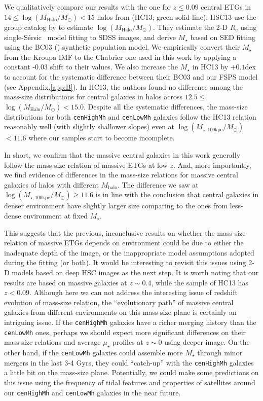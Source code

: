 \documentclass{emulateapj}
\def\ser{{S\'{e}rsic\ }}
\def\rbcg{\texttt{cenHighMh}}
\def\nbcg{\texttt{cenLowMh}}
\def\mstar{{$M_{\star}$}}
\def\mhalo{{$M_{\mathrm{halo}}$}}
\def\logmh{{$\log (M_{\mathrm{Halo}}/M_{\odot})$}}
\def\logmtot{{$\log (M_{\star,100\mathrm{kpc}}/M_{\odot})$}}
\def\mden{{$\mu_{\star}$}}
\begin{document}
\begin{CJK*}{UTF8}{gbsn}
    We qualitatively compare our results with the one for $z\leq 0.09$ central ETGs in  
    $14\le$\logmh{}$<15$ halos from \citealt{HCompany13} (HC13; green solid line).
    HSC13 use the group catalog by \citet{Yang2007} to estimate \logmh{}. 
    They estimate the 2-D $R_{\mathrm{e}}$ using single-\ser{} model fitting to SDSS images,
    and derive \mstar{} based on SED fitting using the BC03 (\citealt{BC03}) synthetic 
    population model.
    We empirically convert their \mstar{} from the Kroupa IMF to the Chabrier one 
    used in this work by applying a constant -0.03 shift to their values. 
    We also increase the \mstar{} in HC13 by $+0.1$dex to account for the systematic 
    difference between their BC03 and our FSPS model (see Appendix.\ref{app:B}). 
    In HC13, the authors found no difference among the mass-size distributions for 
    central galaxies in halos across $12.5\le$\logmh{}$<15.0$. 
    Despite all the systematic differences, the mass-size distributions for both \rbcg{} 
    and \nbcg{} galaxies follow the HC13 relation reasonably well (with slightly
    shallower slopes) even at \logmtot{}$< 11.6$ where our samples start to become 
    incomplete. 
    
    In short, we confirm that the massive central galaxies in this work generally 
    follow the mass-size relation of massive ETGs at low-$z$.
    And, more importantly, we find evidence of differences in the mass-size relations for 
    massive central galaxies of halos with different \mhalo{}. 
    The difference we saw at \logmtot{}$\geq 11.6$ is in line with the conclusion that
    central galaxies in denser environment have slightly larger size comparing to the 
    ones from less-dense environment at fixed \mstar{}. 
    
    This suggests that the previous, inconclusive results on whether the 
    mass-size relation of massive ETGs depends on environment could be due to 
    either the inadequate depth of the image, or the inappropriate model assumptions 
    adopted during the fitting (or both).  
    It would be interesting to revisit this issues using 2-D models based on deep HSC 
    images as the next step.
    It is worth noting that our results are based on massive galaxies at $z\sim 0.4$, 
    while the sample of HC13 has $z<0.09$.
    Although here we can not address the interesting issue of redshift evolution of 
    mass-size relation, the ``evolutionary path'' of massive central galaxies from 
    different environments on this mass-size plane is certainly an intriguing issue. 
    If the \rbcg{} galaxies have a richer merging history than the \nbcg{} ones, 
    perhaps we should expect more significant differences on their mass-size 
    relations and average \mden{} profiles at $z\sim 0$ using deeper image. 
    On the other hand, if the \nbcg{} galaxies could assemble more \mstar{} through minor 
    mergers in the last 3-4 Gyrs, they could ``catch-up'' with the \rbcg{} galaxies 
    a little bit on the mass-size plane. 
    Potentially, we could make some predictions on this issue using the frequency of 
    tidal features and properties of satellites around our \rbcg{} and \nbcg{} 
    galaxies in the near future.
    

\end{CJK*}
\end{document}
